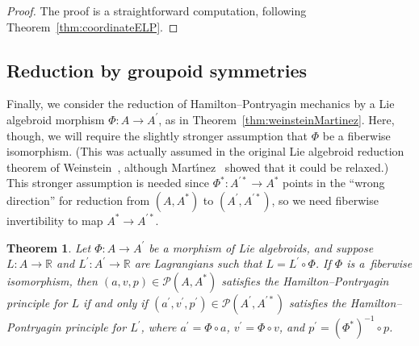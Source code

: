 \documentclass[10pt,a4paper]{amsart}
\numberwithin{equation}{section}
\newtheorem{Theorem}{Theorem}[section]
\begin{document}
\begin{proof} The proof is a straightforward computation, following Theorem~\ref{thm:coordinateELP}.
\end{proof}

\subsection{Reduction by groupoid symmetries}\label{sec:hpReduction}

Finally, we consider the reduction of Hamilton--Pontryagin mechanics by a Lie algebroid morphism $ \Phi \colon A \rightarrow A ^\prime $, as in Theorem~\ref{thm:weinsteinMartinez}. Here, though, we will require the slightly stronger assumption that $ \Phi $ be a f\/iberwise isomorphism. (This was actually assumed in the original Lie algebroid reduction theorem of Weinstein~\cite{Weinstein1996}, although Mart\'{\i}nez~\cite{Martinez2008} showed that it could be relaxed.) This stronger assumption is needed since $ \Phi ^\ast \colon A ^{ \prime \ast } \rightarrow A ^\ast $ points in the ``wrong direction'' for reduction from $ ( A, A ^\ast ) $ to $ ( A ^\prime , A ^{ \prime \ast } ) $, so we need f\/iberwise invertibility to map $ A ^\ast \rightarrow A ^{ \prime \ast }$.


\begin{Theorem} \label{thm:hpMorphismReduction}Let $ \Phi \colon A \rightarrow A ^\prime $ be a morphism of Lie algebroids, and suppose $ L \colon A \rightarrow \mathbb{R} $ and $ L ^\prime \colon A ^\prime \rightarrow \mathbb{R} $ are Lagrangians such that $ L = L ^\prime \circ \Phi $. If $ \Phi $ is a~fiberwise isomorphism, then $ ( a, v , p ) \in \mathcal{P} ( A , A ^\ast ) $ satisfies the Hamilton--Pontryagin principle for $L$ if and only if $ ( a ^\prime , v ^\prime , p ^\prime ) \in \mathcal{P} ( A ^\prime , A ^{\prime \ast} ) $ satisfies the Hamilton--Pontryagin principle for $L ^\prime $, where $ a ^\prime = \Phi \circ a $, $ v ^\prime = \Phi \circ v $, and $ p ^\prime = (\Phi ^\ast) ^{-1} \circ p $.
\end{Theorem}
\end{document}
